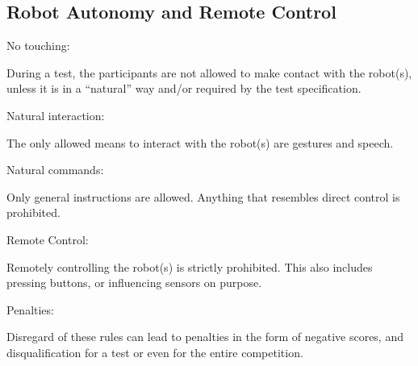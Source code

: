 \subsection{Robot Autonomy and Remote Control}
\begin{enumerate}
{\bf\item No touching:} During a test, the participants are not allowed to make contact with the robot(s), 
  unless it is in a ``natural'' way and/or required by the test specification. 
{\bf\item Natural interaction:} The only allowed means to interact with the robot(s) are gestures and speech.
{\bf\item Natural commands:} Only general instructions are allowed. 
Anything that resembles direct control is prohibited.
 
{\bf\item Remote Control:} Remotely controlling the robot(s) is strictly prohibited. 
This also includes pressing buttons, or influencing sensors on purpose.
{\bf\item Penalties:} Disregard of these rules can lead to penalties in the form of negative scores, and disqualification 
for a test or even for the entire competition. 
\end{enumerate}


